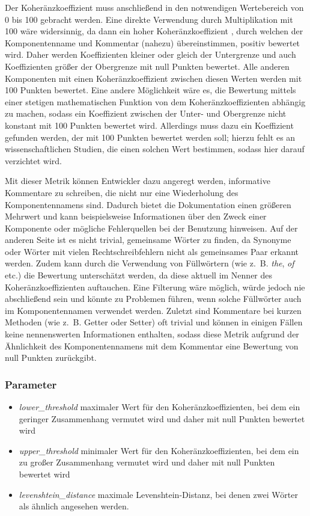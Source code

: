 Der Koheränzkoeffizient muss anschließend in den notwendigen Wertebereich von 0 bis 100 gebracht werden. Eine direkte Verwendung durch Multiplikation mit 100 wäre widersinnig, da dann ein hoher Koheränzkoeffizient , durch welchen der Komponentenname  und Kommentar (nahezu) übereinstimmen, positiv bewertet wird. Daher werden Koeffizienten kleiner oder gleich der Untergrenze und auch Koeffizienten  größer der Obergrenze mit null Punkten bewertet. Alle anderen Komponenten mit einen Koheränzkoeffizient zwischen diesen Werten werden mit 100 Punkten bewertet. Eine andere Möglichkeit wäre es, die Bewertung mittels einer stetigen mathematischen Funktion von dem Koheränzkoeffizienten abhängig zu machen, sodass ein Koeffizient zwischen der Unter- und Obergrenze nicht konstant mit 100 Punkten bewertet wird. Allerdings muss dazu ein Koeffizient gefunden werden, der mit 100 Punkten bewertet werden soll; hierzu fehlt es an wissenschaftlichen Studien, die einen solchen Wert bestimmen, sodass hier darauf verzichtet wird. 

Mit dieser Metrik können Entwickler dazu angeregt werden, informative Kommentare zu schreiben, die nicht nur eine Wiederholung des Komponentennamens sind. Dadurch bietet die Dokumentation einen größeren Mehrwert und kann beispielsweise Informationen über den Zweck einer Komponente oder mögliche Fehlerquellen bei der Benutzung hinweisen. Auf der anderen Seite ist es nicht trivial, gemeinsame Wörter zu finden, da Synonyme oder Wörter mit vielen Rechtschreibfehlern nicht als gemeinsames Paar erkannt werden. Zudem  kann durch die Verwendung von Füllwörtern (wie z.~B. \textit{the}, \textit{of} etc.) die Bewertung unterschätzt werden, da diese aktuell im Nenner des Koheränzkoeffizienten auftauchen. Eine Filterung wäre möglich, würde jedoch nie abschließend sein und könnte zu Problemen führen, wenn solche Füllwörter auch im Komponentennamen verwendet werden. Zuletzt sind Kommentare bei kurzen Methoden (wie z.~B. Getter oder Setter) oft trivial und können in einigen Fällen keine nennenswerten Informationen enthalten, sodass diese Metrik aufgrund der Ähnlichkeit des Komponentennamens mit dem Kommentar eine Bewertung von null Punkten zurückgibt. 

  \subsubsection{Parameter}
  \begin{itemize}
     \item \textit{lower\_threshold} maximaler Wert für den  Koheränzkoeffizienten, bei dem ein geringer Zusammenhang vermutet wird und daher mit null Punkten bewertet wird
    \item \textit{upper\_threshold} minimaler Wert für den  Koheränzkoeffizienten, bei dem ein zu großer Zusammenhang vermutet wird und daher mit null Punkten bewertet wird
\item \textit{levenshtein\_distance} maximale Levenshtein-Distanz, bei denen zwei Wörter als ähnlich angesehen werden. 
 \end{itemize}
